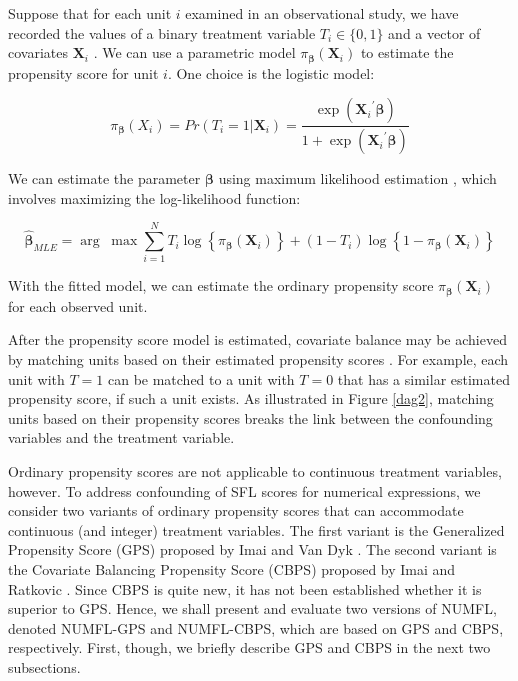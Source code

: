Suppose that for each unit $i$ examined in an observational study, we have recorded the values of a binary treatment variable ${T_i} \in \{ 0,1\} $ and a vector of covariates ${\pmb{X}_i}$ .  We can use a parametric model ${\pi _{\pmb\beta} }({\pmb{X}_i})$ to estimate the propensity score for unit $i$.  One choice is the logistic model:

\begin{equation*}
{\pi _{\pmb\beta} }({X_i}) = Pr({T_i} = 1|{\pmb{X}_i}) = \frac{{\exp ({\pmb{X}_i}^\prime \pmb\beta )}}{{1 + \exp ({\pmb{X}_i}^\prime \pmb\beta )}}
\end{equation*}

We can estimate the parameter $\pmb\beta$ using maximum likelihood estimation \cite{Silvapulle1981}, which involves maximizing the log-likelihood function:

\begin{equation}\label{eq1}
{\pmb{\hat \beta} _{MLE}} = \arg \;\max \sum\limits_{i = 1}^N {{T_i}\log \left\{ {{\pi _{\pmb\beta} }({\pmb{X}_i})} \right\} + (1 - {T_i})} \log \left\{ {1 - {\pi _{\pmb\beta} }({\pmb{X}_i})} \right\}
\end{equation}

With the fitted model, we can estimate the ordinary propensity score  ${\pi _{\pmb\beta}}({\pmb{X}_i})$ for each observed unit.

After the propensity score model is estimated, covariate balance may be achieved by matching units based on their estimated propensity scores \cite{Rosenbaum1983}.  For example, each unit with $T=1$ can be matched to a unit with $T=0$ that has a similar estimated propensity score, if such a unit exists.  As illustrated in Figure \ref{dag2}, matching units based on their propensity scores breaks the link between the confounding variables and the treatment variable.

Ordinary propensity scores are not applicable to continuous treatment variables, however.  To address confounding of SFL scores for numerical expressions, we consider two variants of ordinary propensity scores that can accommodate continuous (and integer) treatment variables.  The first variant is the Generalized Propensity Score (GPS) proposed by Imai and Van Dyk \cite{Imai2004}.  The second variant is the Covariate Balancing Propensity Score (CBPS) proposed by Imai and Ratkovic \cite{Imai2014}.  Since CBPS is quite new, it has not been established whether it is superior to GPS.  Hence, we shall present and evaluate two versions of NUMFL, denoted NUMFL-GPS and NUMFL-CBPS, which are based on GPS and CBPS, respectively.  First, though, we briefly describe GPS and CBPS in the next two subsections.


